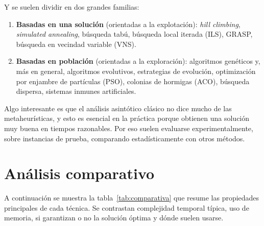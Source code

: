 \documentclass[12pt,letterpaper]{article}
\begin{document}
Y se suelen dividir en dos grandes familias:
\begin{enumerate}
    \item \textbf{Basadas en una solución} (orientadas a la explotación): 
    \emph{hill climbing}, \emph{simulated annealing}, búsqueda tabú, búsqueda 
    local iterada (ILS), GRASP, búsqueda en vecindad variable (VNS).
    \item \textbf{Basadas en población} (orientadas a la exploración): 
    algoritmos genéticos y, más en general, algoritmos evolutivos, estrategias 
    de evolución, optimización por enjambre de partículas (PSO), colonias de 
    hormigas (ACO), búsqueda dispersa, sistemas inmunes artificiales.
\end{enumerate}

Algo interesante es que el análisis asintótico clásico no dice mucho 
de las metaheurísticas, y esto es esencial en la práctica porque obtienen una
solución muy buena en tiempos razonables. Por eso suelen evaluarse 
experimentalmente, sobre instancias de prueba, comparando estadísticamente 
con otros métodos.

\section{Análisis comparativo}
\label{sec:comparativo}

A continuación se muestra la tabla~\ref{tab:comparativa} que resume las 
propiedades principales de cada técnica. Se contrastan complejidad temporal 
típica, uso de memoria, si garantizan o no la solución óptima y dónde suelen 
usarse.
\end{document}
